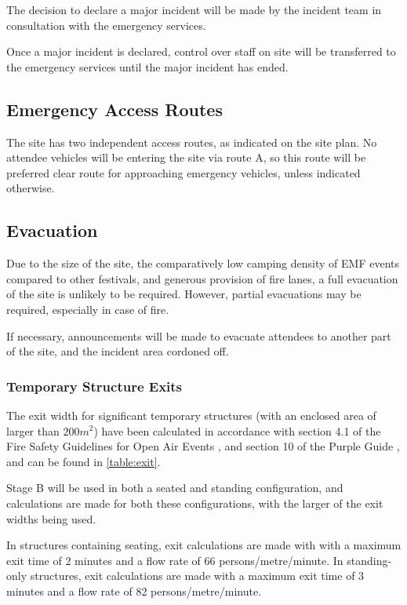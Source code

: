 The decision to declare a major incident will be made by the incident team in
consultation with the emergency services.

Once a major incident is declared, control over staff on site will be transferred
to the emergency services until the major incident has ended.

\subsection{Emergency Access Routes}\label{emergencyaccess}
The site has two independent access routes, as indicated on the site plan. No
attendee vehicles will be entering the site via route A, so this route will be
preferred clear route for approaching emergency vehicles, unless indicated
otherwise.

\subsection{Evacuation}\label{evacuation}
Due to the size of the site, the comparatively low camping density of EMF events
compared to other festivals, and generous provision of fire lanes, a full evacuation
of the site is unlikely to be required. However, partial evacuations may be required,
especially in case of fire.

If necessary, announcements will be made to evacuate attendees to another part of the
site, and the incident area cordoned off.

\subsubsection{Temporary Structure Exits}

The exit width for significant temporary structures (with an enclosed area of larger than
$200m^2$) have been calculated in accordance with section 4.1 of the Fire Safety Guidelines
for Open Air Events \cite{firesafety}, and section 10 of the Purple Guide \cite{purpleguide},
and can be found in \cref{table:exit}.

Stage B will be used in both a seated and standing configuration, and calculations are made for
both these configurations, with the larger of the exit widths being used.

In structures containing seating, exit calculations are made with
with a maximum exit time of 2 minutes and a flow rate of 66 persons/metre/minute. In
standing-only structures, exit calculations are made with a maximum exit time of 3 minutes and a
flow rate of 82 persons/metre/minute.

